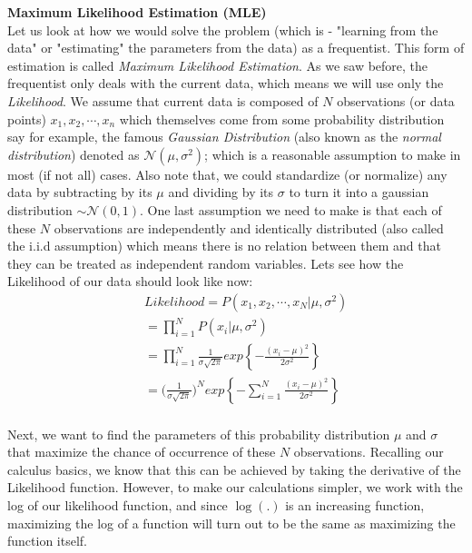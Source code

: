\documentclass[a4paper]{article}
\begin{document}
\noindent \textbf{Maximum Likelihood Estimation (MLE)} \\

\noindent Let us look at how we would solve the problem (which is - "learning from the data" or "estimating" the parameters from the data) as a frequentist. This form of estimation is called \textit{Maximum Likelihood Estimation}. As we saw before, the frequentist only deals with the current data, which means we will use only the \textit{Likelihood}. We assume that current data is composed of $N$ observations (or data points) $x_1, x_2, \cdots , x_n$ which themselves come from some probability distribution say for example, the famous \textit{Gaussian Distribution} (also known as the \textit{normal distribution}) denoted as $\mathcal{N} (\mu,\sigma^2)$; which is a reasonable assumption to make in most (if not all) cases. Also note that, we could standardize (or normalize) any data by subtracting by its $\mu$ and dividing by its $\sigma$ to turn it into a gaussian distribution $\sim \mathcal{N} (0,1)$.  One last assumption we need to make is that each of these $N$ observations are independently and identically distributed (also called the i.i.d assumption) which means there is no relation between them and that they can be treated as independent random variables. Lets see how the Likelihood of our data should look like now:
\begin{equation} \label{eq:4}
\begin{aligned}
& & Likelihood = P(x_1, x_2, \cdots, x_N|\mu, \sigma^2)\\
& & = \prod\limits_{i=1}^{N} P(x_i|\mu, \sigma^2) \\
&& = \prod\limits_{i=1}^{N} \frac{1}{\sigma \sqrt{2 \pi} } exp \left\{ - \frac{{(x_i-\mu)}^2} {2 \sigma^2} \right\} \\
&& = \bigg( \frac{1}{\sigma \sqrt{2 \pi} } \bigg)^N exp \left\{ - \sum_{i=1}^{N}  \frac{ {(x_i-\mu)}^2} {2 \sigma^2} \right\} \\
\end{aligned}
\end{equation}


\noindent Next, we want to find the parameters of this probability distribution $\mu$ and $\sigma$ that maximize the chance of occurrence of these $N$ observations. Recalling our calculus basics, we know that this can be achieved by taking the derivative of the Likelihood function. However, to make our calculations simpler, we work with the log of our likelihood function, and since $\log(.)$ is an increasing function, maximizing the log of a function will turn out to be the same as maximizing the function itself.
\end{document}
